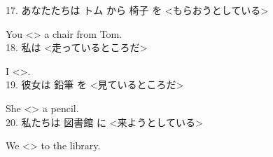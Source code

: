 \documentclass[uplatex,
paper=a4,
fontsize=18pt,
jafontsize=16pt,
number_of_lines=30,
line_length=30zh,
baselineskip=25pt,
]{jlreq}
\begin{document}
17.  あなたたちは トム から 椅子 を <もらおうとしている>

  You <\hspace{3em}\hspace{3em}\hspace{2em}> a chair from Tom.
\\

18.  私は <走っているところだ>

  I <\hspace{3em}\hspace{3em}\hspace{2em}>.
\\

19.  彼女は 鉛筆 を <見ているところだ>

  She <\hspace{3em}\hspace{3em}\hspace{2em}> a pencil.
\\

20.  私たちは 図書館 に <来ようとしている>

  We <\hspace{3em}\hspace{3em}\hspace{2em}> to the library.
\\
\end{document}
